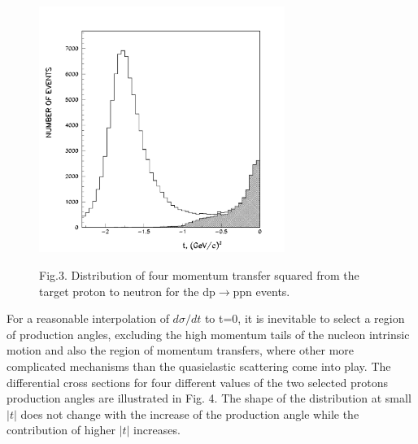\documentclass[a4paper,12pt]{article}
\begin{document}
\begin{figure}[hbt]
  \begin{center}
    \includegraphics[width=8cm]{dist.pdf}
  \end{center}
  \vspace{0.4mm}
  Fig.3. Distribution of four momentum transfer squared from the target proton
  to neutron for the dp$\to$ppn events. \\

\end{figure}

For a reasonable interpolation of $d\sigma/dt$ to t=0, it is inevitable
to select a region of production angles, excluding the high momentum
tails of the nucleon intrinsic motion and also the region of momentum
transfers, where other more complicated mechanisms than the quasielastic
scattering come into play. The differential cross sections
for four different values of the two selected protons production angles are
illustrated in Fig. 4.  The shape
of the distribution at small $\vert t \vert$ does not change with the increase
of the production angle while
the contribution of higher $\vert t \vert$ increases.
\end{document}
